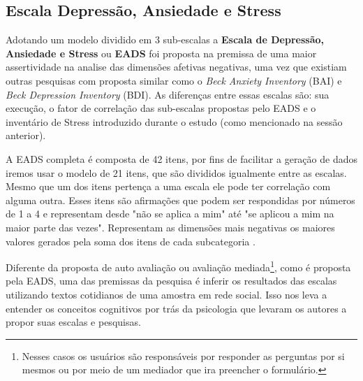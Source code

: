 \subsection{Escala Depressão, Ansiedade e Stress}
Adotando um modelo dividido em 3 sub-escalas a \textbf{Escala de Depressão, Ansiedade e Stress} ou \textbf{EADS} foi proposta na premissa de uma maior assertividade na analise das dimensões afetivas negativas, uma vez que existiam outras pesquisas com proposta similar como o \textit{ Beck Anxiety Inventory} (BAI) e \textit{Beck Depression Inventory} (BDI). As diferenças entre essas escalas são: sua execução, o fator de correlação das sub-escalas propostas pelo EADS e o inventário de Stress introduzido durante o estudo (como mencionado na sessão anterior).

A EADS completa é composta de 42 itens, por fins de facilitar a geração de dados iremos usar o modelo de 21 itens, que são divididos igualmente entre as escalas. Mesmo que um dos itens pertença a uma escala ele pode ter correlação com alguma outra. Esses itens são afirmações que podem ser respondidas por números de 1 a 4 e representam desde "não se aplica a mim" até "se aplicou a mim na maior parte das vezes". Representam as dimensões mais negativas os maiores valores gerados pela soma dos itens de cada subcategoria \cite{lovibond1995structure, ribeiro2004contribuiccao}.

Diferente da proposta de auto avaliação ou avaliação mediada\footnote{Nesses casos os usuários são responsáveis por responder as perguntas por si mesmos ou por meio de um mediador que ira preencher o formulário.}, como é proposta pela EADS,  uma das premissas da pesquisa é inferir os resultados das escalas utilizando textos cotidianos de uma amostra em rede social. Isso nos leva a entender os conceitos cognitivos por trás da psicologia que levaram os autores a propor suas escalas e pesquisas.


